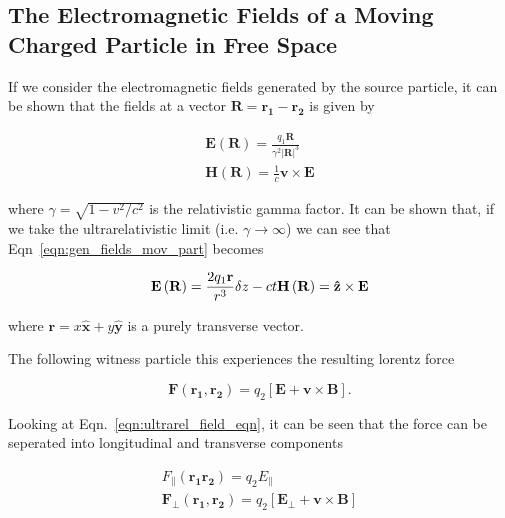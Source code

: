 \subsection{The Electromagnetic Fields of a Moving Charged Particle in Free Space}

If we consider the electromagnetic fields generated by the source particle, it can be shown that the fields at a vector $\mathbf{R} = \mathbf{r_{1}} - \mathbf{r_{2}}$ is given by

\begin{align}
\mathbf{E}\left( \mathbf{R}  \right) = \frac{q_{1}\mathbf{R}}{\gamma^{2}\left| \mathbf{R} \right|^{3}} \\
\mathbf{H}\left( \mathbf{R}  \right) = \frac{1}{c}\mathbf{v} \times \mathbf{E}
\label{eqn:gen_fields_mov_part}
\end{align}

where $\gamma = \sqrt{1- v^{2}/c^{2}}$ is the relativistic gamma factor. It can be shown that, if we take the ultrarelativistic limit (i.e. $\gamma \rightarrow \infty$) we can see that Eqn~\ref{eqn:gen_fields_mov_part} becomes

\begin{equation}
\mathbf{E}\left( \mathbf{R}  \right) = \frac{2q_{1}\mathbf{r}}{r^{3}}\delta{z-ct} \\
\mathbf{H}\left( \mathbf{R}  \right) = \mathbf{\hat{z}} \times \mathbf{E}
\label{eqn:ultrarel_field_eqn}
\end{equation}

where $\mathbf{r} = x\mathbf{\hat{x}} + y\mathbf{\hat{y}}$ is a purely transverse vector.

The following witness particle this experiences the resulting lorentz force 

\begin{equation}
\mathbf{F}\left(\mathbf{r_{1}}, \mathbf{r_{2}}  \right) = q_{2}\left[ \mathbf{E} + \mathbf{v} \times \mathbf{B}  \right]. 
\end{equation}

Looking at Eqn.~\ref{eqn:ultrarel_field_eqn}, it can be seen that the force can be seperated into longitudinal and transverse components 

\begin{align}
F_{\parallel}\left(\mathbf{r_{1}} \mathbf{r_{2}}  \right) = q_{2}E_{\parallel} \\
\mathbf{F_{\perp}}\left(\mathbf{r_{1}}, \mathbf{r_{2}}  \right)  = q_{2}\left[ \mathbf{E_{\perp}} + \mathbf{v} \times \mathbf{B} \right]
\end{align}

